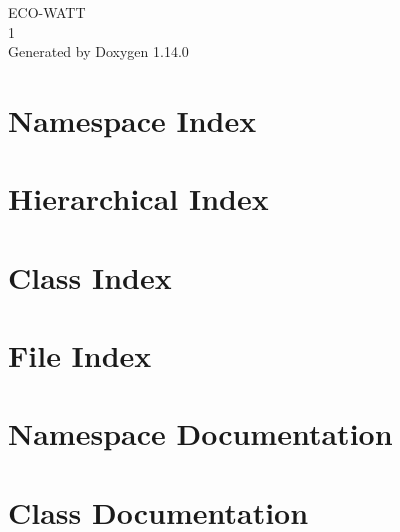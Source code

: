 \documentclass[twoside]{book}
\newcommand{\+}{\discretionary{\mbox{\scriptsize$\hookleftarrow$}}{}{}}
\newcommand{\clearemptydoublepage}{%
    \newpage{\pagestyle{empty}\cleardoublepage}%
  }
\begin{document}
  \raggedbottom
    \hypersetup{pageanchor=false,
                bookmarksnumbered=true,
                pdfencoding=unicode
               }
  \begin{titlepage}
  \vspace*{7cm}
  \begin{center}%
  {\Large ECO-\/\+WATT}\\
  [1ex]\large 1 \\
  \vspace*{1cm}
  {\large Generated by Doxygen 1.14.0}\\
  \end{center}
  \end{titlepage}
  \clearemptydoublepage
  \tableofcontents
  \clearemptydoublepage
  \hypersetup{pageanchor=true}
\chapter{Namespace Index}

\chapter{Hierarchical Index}

\chapter{Class Index}

\chapter{File Index}

\chapter{Namespace Documentation}


\chapter{Class Documentation}

















\end{document}
